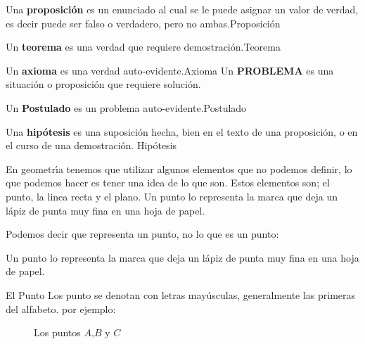 \begin{ideas}
\begin{ideas}{Una \textbf{proposición} es un enunciado al cual se le puede asignar un valor de verdad,
es decir puede ser falso o verdadero, pero no ambas.}{Proposición}
\begin{ideas}{Un \textbf{teorema} es una verdad que requiere demostración.}{Teorema}
 \end{ideas}
\begin{ideas}{Un \textbf{axioma} es una verdad auto-evidente.}{Axioma}
Un \textbf{PROBLEMA} es una situación o proposición que requiere solución.
 \end{ideas}
\begin{ideas}{Un \textbf{Postulado} es un problema auto-evidente.}{Postulado}
\end{ideas}
\begin{ideas}{Una \textbf{hipótesis} es una suposición hecha, bien en el texto
de una proposición, o en el
curso de una demostración.
}{Hipótesis}
\end{ideas}
\end{ideas}
\end{ideas}
\label{sec:1.2}
En geometr\'{\i}a tenemos que utilizar algunos elementos que no podemos
definir, lo que podemos hacer es tener una idea de lo que son. Estos
elementos son; el punto, la linea recta y el plano.
Un punto lo representa la marca que deja un l\'{a}piz de punta muy fina en
una hoja de papel.
\begin{tndefinido}{Podemos decir que representa un punto, no lo que es un punto:

Un punto lo representa la marca que deja un l\'{a}piz de punta muy fina en
una hoja de papel.}{El Punto}
 Los punto se denotan con letras may\'{u}sculas, generalmente las primeras
del alfabeto. por ejemplo: \\
\begin{figure}[H]
\centering
\caption{Los puntos $A$,$B$ y $C$}
\label{fig1}
\end{figure}
\end{tndefinido}

